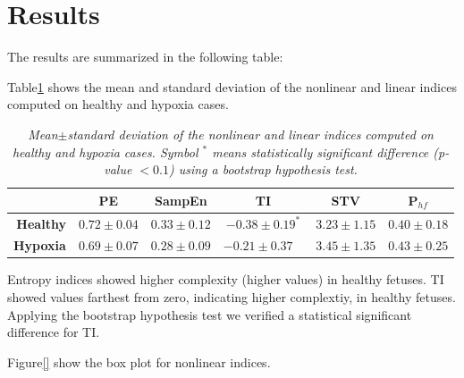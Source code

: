 \section{Results}
\label{sec:experiments}

The results are summarized in the following table:


Table\ref{tab:tab1} shows the mean and standard deviation of the nonlinear and linear indices computed on healthy and hypoxia cases.

\begin{table}[t]
\centering
\begin{tabular}{r|ccccc}\hline

	& \textbf{PE}	& \textbf{SampEn}	& \textbf{TI}	& \textbf{STV}	& \textbf{P$_{hf}$}\\
	\hline\hline
{\textbf{Healthy}} & $0.72\pm0.04$ & $0.33\pm0.12$ & $\bm{-0.38\pm0.19^*}$ & $3.23\pm1.15$ &
$0.40\pm0.18$\\
{\textbf{Hypoxia}} & $0.69\pm0.07$ & $0.28\pm0.09$ & $\bm{-0.21\pm0.37}\phantom{*}$ & $3.45\pm1.35$ & $0.43\pm0.25$\\\hline
\end{tabular}
\caption{\emph{Mean$\pm$standard deviation of the nonlinear and linear indices computed on healthy and hypoxia cases. Symbol $^*$ means statistically significant difference (p-value $< 0.1$) using a bootstrap hypothesis test.}}
\label{tab:tab1}
\end{table}

Entropy indices showed higher complexity (higher values) in healthy fetuses. TI showed values farthest from zero, indicating higher complextiy, in healthy fetuses. Applying the bootstrap hypothesis test we verified a statistical significant difference for TI. 

Figure\ref{} show the box plot for nonlinear indices. 


